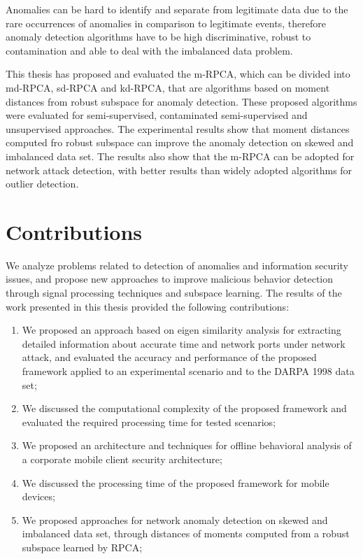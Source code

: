 Anomalies can be hard to identify and separate from legitimate data due to the rare occurrences of anomalies in comparison to legitimate events, therefore anomaly detection algorithms have to be high discriminative, robust to contamination and able to deal with the imbalanced data problem.

This thesis has proposed and evaluated the m-RPCA, which can be divided into md-RPCA, sd-RPCA and kd-RPCA, that are algorithms based on moment distances from robust subspace for anomaly detection. These proposed algorithms were evaluated for semi-supervised, contaminated semi-supervised and unsupervised approaches. The experimental results show that moment distances computed fro robust subspace can improve the anomaly detection on skewed and imbalanced data set. The results also show that the m-RPCA can be adopted for network attack detection, with better results than widely adopted algorithms for outlier detection.

\section{Contributions}
\label{sec:5_conc_contributions}

We analyze problems related to detection of anomalies and information security issues, and propose new approaches to improve malicious behavior detection through signal processing techniques and subspace learning. The results of the work presented in this thesis provided the following contributions:

\begin{enumerate}
	\item We proposed an approach based on eigen similarity analysis for extracting detailed information about accurate time and network ports under network attack, and evaluated the accuracy and performance of the proposed framework applied to an experimental scenario and to the DARPA 1998 data set;
	\item We discussed the computational complexity of the proposed framework and evaluated the required processing time for tested scenarios;
	\item We proposed an architecture and techniques for offline behavioral analysis of a corporate mobile client security architecture;
	\item We discussed the processing time of the proposed framework for mobile devices;
	\item We proposed approaches for network anomaly detection on skewed and imbalanced data set, through distances of moments computed from a robust subspace learned by RPCA;
\end{enumerate}


